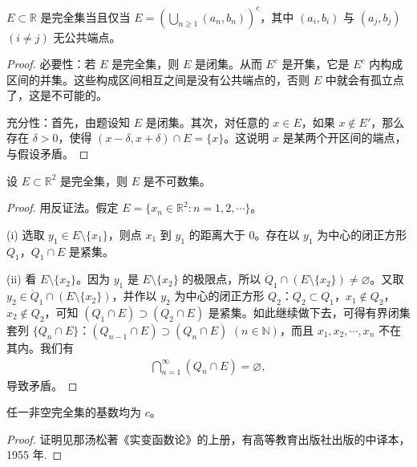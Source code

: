 \documentclass[../../main.tex]{subfiles}
\begin{document}
\begin{example}
\(E\subset\mathbb{R}\) 是完全集当且仅当 \(E = \left(\bigcup_{n\geqslant 1}(a_n,b_n)\right)^c\)，其中 \((a_i,b_i)\) 与 \((a_j,b_j)\) \((i\neq j)\) 无公共端点。
\end{example}
\begin{proof}
{\heiti 必要性：}若 \(E\) 是完全集，则 \(E\) 是闭集。从而 \(E^c\) 是开集，它是 \(E^c\) 内构成区间的并集。这些构成区间相互之间是没有公共端点的，否则 \(E\) 中就会有孤立点了，这是不可能的。

{\heiti 充分性：}首先，由题设知 \(E\) 是闭集。其次，对任意的 \(x\in E\)，如果 \(x\notin E'\)，那么存在 \(\delta>0\)，使得 \((x - \delta,x + \delta)\cap E = \{x\}\)。这说明 \(x\) 是某两个开区间的端点，与假设矛盾。

\end{proof}

\begin{example}
设 \(E\subset\mathbb{R}^2\) 是完全集，则 \(E\) 是不可数集。
\end{example}
\begin{proof}
用反证法。假定 \(E = \{x_n\in\mathbb{R}^2: n = 1,2,\cdots\}\)。

(i) 选取 \(y_1\in E\setminus\{x_1\}\)，则点 \(x_1\) 到 \(y_1\) 的距离大于 \(0\)。存在以 \(y_1\) 为中心的闭正方形 \(Q_1\)，\(Q_1\cap E\) 是紧集。

(ii) 看 \(E\setminus\{x_2\}\)。因为 \(y_1\) 是 \(E\setminus\{x_2\}\) 的极限点，所以 \(\mathring{Q}_1\cap (E\setminus\{x_2\})\neq\varnothing\)。又取 \(y_2\in\mathring{Q}_1\cap (E\setminus\{x_2\})\)，并作以 \(y_2\) 为中心的闭正方形 \(Q_2\)：\(Q_2\subset Q_1\)，\(x_1\notin Q_2\)，\(x_2\notin Q_2\)，可知 \((Q_1\cap E)\supset (Q_2\cap E)\) 是紧集。如此继续做下去，可得有界闭集套列 \(\{Q_n\cap E\}\)：\((Q_{n - 1}\cap E)\supset (Q_n\cap E)\) \((n\in\mathbb{N})\)，而且 \(x_1,x_2,\cdots,x_n\) 不在其内。我们有
\begin{align*}
\bigcap_{n = 1}^{\infty}(Q_n\cap E)=\varnothing,
\end{align*}
导致矛盾。 

\end{proof}

\begin{proposition}
任一非空完全集的基数均为 \(c\)。
\end{proposition}
\begin{proof}
证明见那汤松著《实变函数论》的上册，有高等教育出版社出版的中译本，1955 年.

\end{proof}
\end{document}
